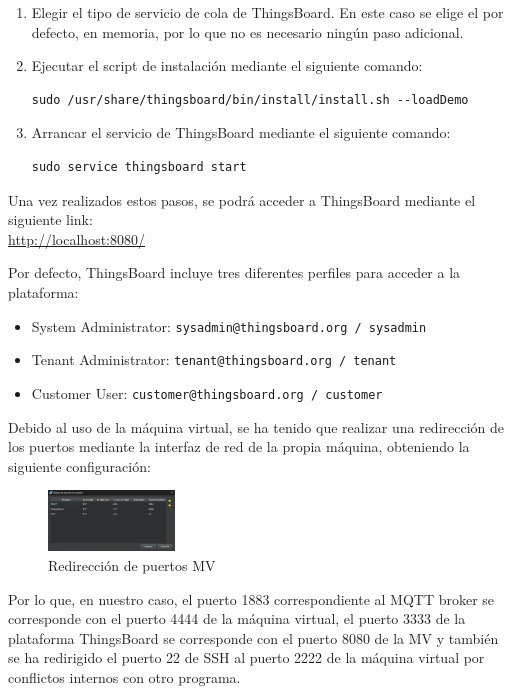 \begin{enumerate}
    \item Elegir el tipo de servicio de cola de ThingsBoard. En este caso se elige el por defecto, en memoria, por lo que no es necesario ningún paso adicional.

    \item Ejecutar el script de instalación mediante el siguiente comando:
    \begin{verbatim}
sudo /usr/share/thingsboard/bin/install/install.sh --loadDemo
    \end{verbatim}

    \item Arrancar el servicio de ThingsBoard mediante el siguiente comando:
    \begin{verbatim}
sudo service thingsboard start
    \end{verbatim}
\end{enumerate}

Una vez realizados estos pasos, se podrá acceder a ThingsBoard mediante el siguiente link: \\
\url{http://localhost:8080/}

Por defecto, ThingsBoard incluye tres diferentes perfiles para acceder a la plataforma:
\begin{itemize}
    \item System Administrator: \texttt{sysadmin@thingsboard.org / sysadmin}
    \item Tenant Administrator: \texttt{tenant@thingsboard.org / tenant}
    \item Customer User: \texttt{customer@thingsboard.org / customer}
\end{itemize}

Debido al uso de la máquina virtual, se ha tenido que realizar una redirección de los puertos mediante la interfaz de red de la propia máquina, obteniendo la siguiente configuración:

\begin{figure}[H]
    \centering
    \includegraphics[width=0.3\textwidth]{images/3-software/3-2-2-thingsboard/PuertosMV.png}
    \caption{Redirección de puertos MV}
    \label{fig:3-2-2-PuertosMV}
\end{figure}

Por lo que, en nuestro caso, el puerto 1883 correspondiente al MQTT broker se corresponde con el puerto 4444 de la máquina virtual, el puerto 3333 de la plataforma ThingsBoard se corresponde con el puerto 8080 de la MV y también se ha redirigido el puerto 22 de SSH al puerto 2222 de la máquina virtual por conflictos internos con otro programa.

